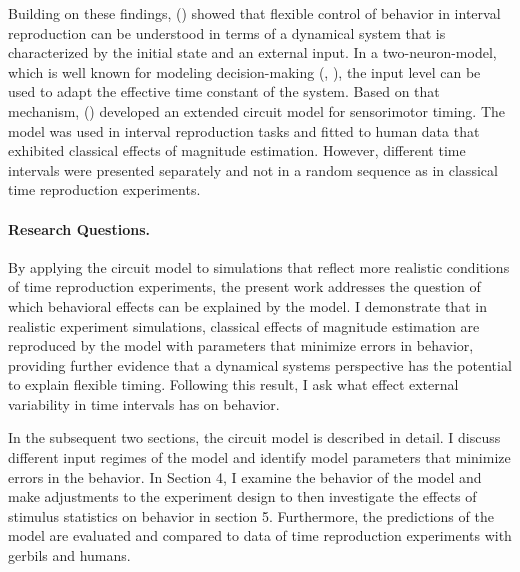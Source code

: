 \documentclass[10pt]{article}
\begin{document}

Building on these findings, \citeauthor{Remington2018} (\citeyear{Remington2018}) showed that flexible control of behavior in interval reproduction can be understood in terms of a dynamical system that is characterized by the initial state and an external input.
 In a two-neuron-model, which is well known for modeling decision-making (\cite{Wang2002}, \cite{Roxin2008}), the input level can be used to adapt the effective time constant of the system.
Based on that mechanism, \citeauthor{Egger2020} (\citeyear{Egger2020}) developed an extended circuit model for sensorimotor timing.
The model was used in interval reproduction tasks and fitted to human data that exhibited classical effects of magnitude estimation. 
However, different time intervals were presented separately and not in a random sequence as in classical time reproduction experiments. 


\paragraph{Research Questions.}
By applying the circuit model to simulations that reflect more realistic conditions of time reproduction experiments, the present work addresses the question of which behavioral effects can be explained by the model. 
I demonstrate that in realistic experiment simulations, classical effects of magnitude estimation are reproduced by the model with parameters that minimize errors in behavior, providing further evidence that a dynamical systems perspective has the potential to explain flexible timing.
Following this result, I ask what effect external variability in time intervals has on behavior. 

In the subsequent two sections, the circuit model is described in detail. 
I discuss different input regimes of the model and identify model parameters that minimize errors in the behavior. 
In Section 4, I examine the behavior of the model and make adjustments to the experiment design to then investigate the effects of stimulus statistics on behavior in section 5. Furthermore, the predictions of the model are evaluated and compared to data of time reproduction experiments with gerbils and humans.
\end{document}
